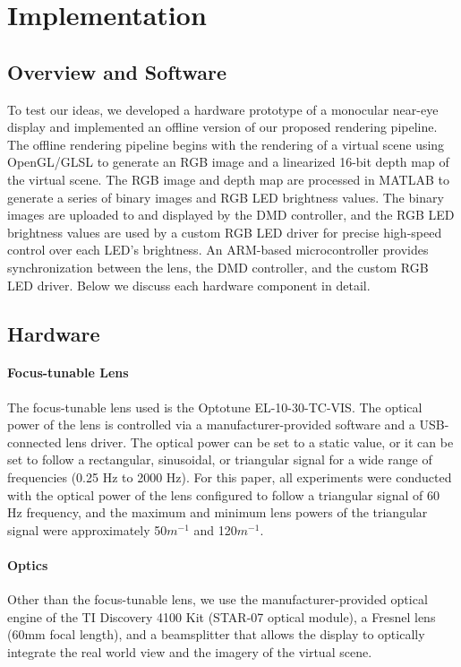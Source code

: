 \section{Implementation}
\subsection{Overview and Software}
To test our ideas, we developed a hardware prototype of a monocular near-eye display and implemented an offline version of our proposed rendering pipeline. The offline rendering pipeline begins with the rendering of a virtual scene using OpenGL/GLSL to generate an RGB image and a linearized 16-bit depth map of the virtual scene. The RGB image and depth map are processed in MATLAB to generate a series of binary images and RGB LED brightness values. The binary images are uploaded to and displayed by the DMD controller, and the RGB LED brightness values are used by a custom RGB LED driver for precise high-speed control over each LED's brightness. An ARM-based microcontroller provides synchronization between the lens, the DMD controller, and the custom RGB LED driver. Below we discuss each hardware component in detail.



\subsection{Hardware}
\paragraph{Focus-tunable Lens} The focus-tunable lens used is the Optotune EL-10-30-TC-VIS. The optical power of the lens is controlled via a manufacturer-provided software and a USB-connected lens driver. The optical power can be set to a static value, or it can be set to follow a rectangular, sinusoidal, or triangular signal for a wide range of frequencies (0.25 Hz to 2000 Hz). For this paper, all experiments were conducted with the optical power of the lens configured to follow a triangular signal of 60 Hz frequency, and the maximum and minimum lens powers of the triangular signal were approximately 50$m^{-1}$ and 120$m^{-1}$. 




\paragraph{Optics} Other than the focus-tunable lens, we use the manufacturer-provided optical engine of the TI Discovery 4100 Kit (STAR-07 optical module), a Fresnel lens (60mm focal length), and a beamsplitter that allows the display to optically integrate the real world view and the imagery of the virtual scene. 

